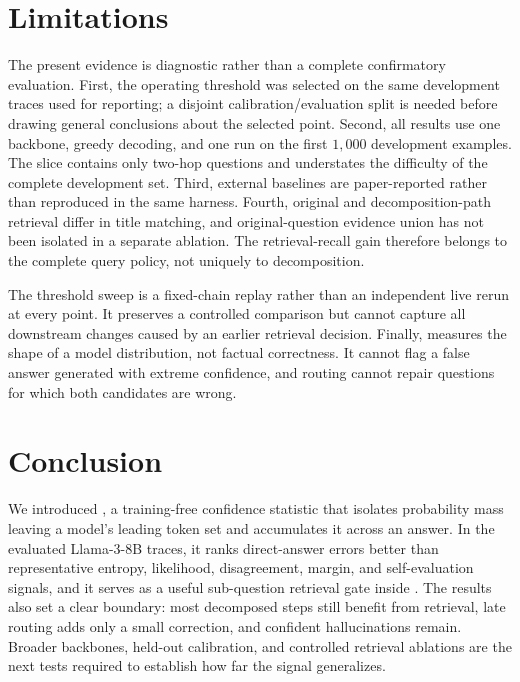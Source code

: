 \section{Limitations}
\label{sec:limitations}

The present evidence is diagnostic rather than a complete confirmatory
evaluation. First, the operating threshold was selected on the same
development traces used for reporting; a disjoint calibration/evaluation split
is needed before drawing general conclusions about the selected point. Second,
all results use one backbone, greedy decoding, and one run on the first
\(1{,}000\) development examples. The \musique{} slice contains only two-hop
questions and understates the difficulty of the complete development set.
Third, external baselines are paper-reported rather than reproduced in the same
harness. Fourth, original and decomposition-path retrieval differ in title
matching, and original-question evidence union has not been isolated in a
separate ablation. The retrieval-recall gain therefore belongs to the complete
query policy, not uniquely to decomposition.

The threshold sweep is a fixed-chain replay rather than an independent live
rerun at every point. It preserves a controlled comparison but cannot capture
all downstream changes caused by an earlier retrieval decision. Finally,
\tailleak{} measures the shape of a model distribution, not factual
correctness. It cannot flag a false answer generated with extreme confidence,
and routing cannot repair questions for which both candidates are wrong.

\section{Conclusion}
\label{sec:conclusion}

We introduced \tailleak{}, a training-free confidence statistic that isolates
probability mass leaving a model's leading token set and accumulates it across
an answer. In the evaluated Llama-3-8B traces, it ranks direct-answer errors
better than representative entropy, likelihood, disagreement, margin, and
self-evaluation signals, and it serves as a useful sub-question retrieval gate
inside \method{}. The results also set a clear boundary: most decomposed steps
still benefit from retrieval, late routing adds only a small correction, and
confident hallucinations remain. Broader backbones, held-out calibration, and
controlled retrieval ablations are the next tests required to establish how
far the signal generalizes.
\label{sec:main-end}
